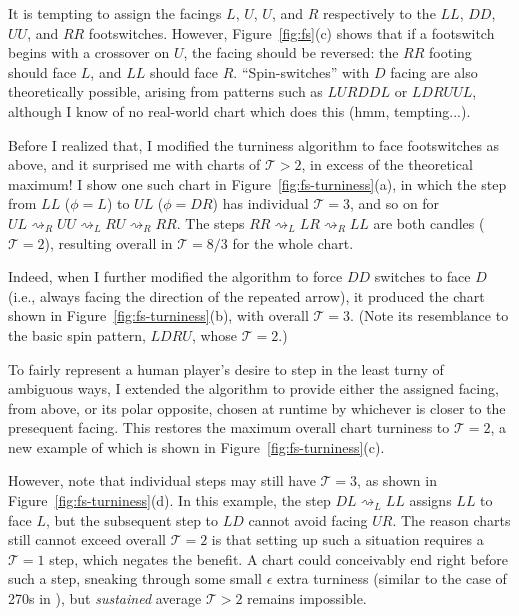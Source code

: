 \documentclass[10pt]{sigplanconf}
\begin{document}
It is tempting to assign the facings $L$, $U$, $U$, and $R$ respectively to the $LL$, $DD$, $UU$, and $RR$ footswitches.
However, Figure~\ref{fig:fs}(c) shows that if a footswitch begins with a crossover on $U$, the facing should be reversed:
the $RR$ footing should face $L$, and $LL$ should face $R$.
``Spin-switches'' with $D$ facing are also theoretically possible,
arising from patterns such as $LURDDL$ or $LDRUUL$, although I know of no real-world chart which does this (hmm, tempting...).

Before I realized that, I modified the turniness algorithm \cite{turniness} to face footswitches as above, %
and it surprised me with charts of $\mathcal{T}>2$, in excess of the theoretical maximum!
I show one such chart in Figure~\ref{fig:fs-turniness}(a), in which the step from $LL$ ($\phi=L$) to $UL$ ($\phi=DR$) has individual $\mathcal{T}=3$, and so on for $UL \rightsquigarrow_R UU \rightsquigarrow_L RU \rightsquigarrow_R RR$.
The steps $RR \rightsquigarrow_L LR \rightsquigarrow_R LL$ are both candles ($\mathcal{T}=2$),
resulting overall in $\mathcal{T}=8/3$ for the whole chart.

Indeed, when I further modified the algorithm to force $DD$ switches to face $D$ (i.e., always facing the direction of the repeated arrow),
it produced the chart shown in Figure~\ref{fig:fs-turniness}(b), with overall $\mathcal{T}=3$.
(Note its resemblance to the basic spin pattern, $LDRU$, whose $\mathcal{T}=2$.)

To fairly represent a human player's desire to step in the least turny of ambiguous ways,
I extended the algorithm to provide either the assigned facing, from above, or its polar opposite,
chosen at runtime by whichever is closer to the presequent facing.
This restores the maximum overall chart turniness to $\mathcal{T}=2$,
a new example of which is shown in Figure~\ref{fig:fs-turniness}(c).

However, note that individual steps may still have $\mathcal{T}=3$,
as shown in Figure~\ref{fig:fs-turniness}(d).
In this example, the step $DL \rightsquigarrow_L LL$ assigns $LL$ to face $L$,
but the subsequent step to $LD$ cannot avoid facing $UR$.
The reason charts still cannot exceed overall $\mathcal{T}=2$ is that
setting up such a situation requires a $\mathcal{T}=1$ step,
which negates the benefit.
A chart could conceivably end right before such a step,
sneaking through some small $\epsilon$ extra turniness \cite{epsilon}
(similar to the case of 270s in \cite{turniness}),
but {\em sustained} average $\mathcal{T}>2$ remains impossible.
\end{document}
